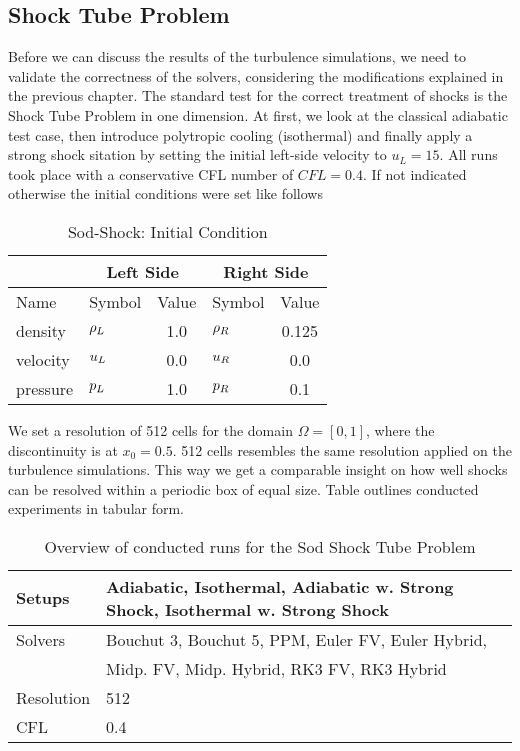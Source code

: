 \subsection{ Shock Tube Problem}
\label{sec:sod-shock-tube}
Before we can discuss the results of the turbulence simulations, we
need to validate the correctness of the solvers, considering the
modifications explained in the previous chapter. The standard test for the
correct treatment of shocks is the  Shock Tube Problem in one
dimension. At first, we look at the classical adiabatic test case, then
introduce polytropic cooling (isothermal) and finally apply a strong shock
sitation by setting the initial left-side velocity to $u_L = 15$. All runs took
place with a conservative CFL number of $CFL = 0.4$.
If not indicated otherwise the initial conditions were set like follows
\begin{table}[H]
\caption{Sod-Shock: Initial Condition}
\centering
\begin{tabular}{llc|lc}
\toprule
&
\multicolumn{2}{c}{Left Side} &
\multicolumn{2}{c}{Right Side} \\
\midrule
Name & Symbol & Value & Symbol & Value\\
\midrule
density         & $\rho_{L}$       & 1.0 & $\rho_{R}$ & 0.125 \\ 
velocity        & $u_{L}$       & 0.0 & $u_{R}$ & 0.0 \\ 
pressure        & $p_{L}$       & 1.0 & $p_{R}$ & 0.1 \\  
\bottomrule
\end{tabular}
\label{tab:initial-state-sod-shock}
\end{table}
We set a resolution of 512 cells for the domain $\Omega = [0,1]$, where the
discontinuity is at $x_0 = 0.5$.  512 cells resembles the same resolution
applied on the turbulence simulations. This way we get a comparable insight on
how well shocks can be resolved within a periodic box of equal size.
Table  outlines conducted experiments in tabular form.
\begin{table}[H]
\caption{Overview of conducted runs for the Sod Shock Tube Problem}
\centering
\begin{tabular}{l|l}
\toprule
Setups & Adiabatic, Isothermal, Adiabatic w. Strong Shock,
Isothermal w. Strong Shock \\ 
\midrule
Solvers  & Bouchut 3, Bouchut 5, PPM, Euler FV, Euler Hybrid\footnotemark,\\
& Midp. FV, Midp. Hybrid, RK3 FV, RK3 Hybrid \\ 
\midrule
Resolution & 512 \\
\midrule
CFL    &  0.4 \\
\bottomrule
\end{tabular}
\label{tab:sod-runs}
\end{table}

